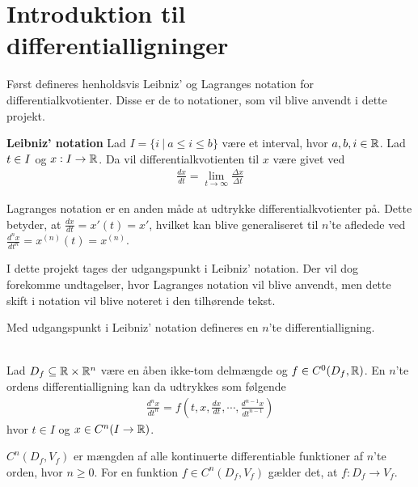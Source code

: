 \section{Introduktion til differentialligninger}
Først defineres henholdsvis Leibniz' og Lagranges notation for differentialkvotienter. Disse er de to notationer, som vil blive anvendt i dette projekt.

\begin{defn}\textbf{Leibniz' notation}
\newline
Lad $I = \{i \ | \ a \leq i \leq b\}$ være et interval, hvor $a,b,i\in \mathbb{R}$. Lad $t \in I $ og $x:I \to \mathbb{R}$. Da vil differentialkvotienten til $x$ være givet ved
%
\begin{align*}
    \frac{dx}{dt}=\lim_{t \to \infty}\frac{\Delta x}{\Delta t}
\end{align*}

\end{defn}
Lagranges notation er en anden måde at udtrykke differentialkvotienter på. Dette betyder, at $\frac{dx}{dt}=x'(t)=x'$, hvilket kan blive generaliseret til $n$'te afledede ved $\frac{d^nx}{dt^n}=x^{(n)}(t)=x^{(n)}$.

I dette projekt tages der udgangspunkt i Leibniz' notation. Der vil dog forekomme undtagelser, hvor Lagranges notation vil blive anvendt, men dette skift i notation vil blive noteret i den tilhørende tekst.

Med udgangspunkt i Leibniz' notation defineres en $n$'te differentialligning.

\begin{defn}\label{def:generel_differentialligning} \textbf{}\\
Lad $D_f \subseteq \mathbb{R} \times \mathbb{R}^n$ være en åben ikke-tom delmængde og $f \in C^0(D_f,\mathbb{R})$. En $n$'te ordens differentialligning kan da udtrykkes som følgende
%
\begin{align*}
    \frac{d^nx}{dt^n}=f\left(t, x, \frac{dx}{dt},\cdots, \frac{d^{n-1}x}{dt^{n-1}}\right )
\end{align*}
hvor $t \in I$ og $x \in C^n(I \to \mathbb{R})$. 
\end{defn}

$C^n(D_f, V_f)$ er mængden af alle kontinuerte differentiable funktioner af $n$'te orden, hvor $n \geq 0$. For en funktion $f \in C^n(D_f, V_f)$ gælder det, at $f: D_f \to V_f$. 


